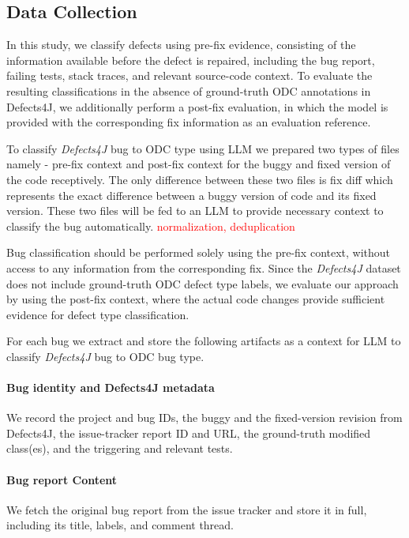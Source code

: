 \subsection{Data Collection}
\label{subsec:collection}
In this study, we classify defects using pre-fix evidence, consisting of the information available before the defect is repaired, including the bug report, failing tests, stack traces, and relevant source-code context. To evaluate the resulting classifications in the absence of ground-truth ODC annotations in Defects4J, we additionally perform a post-fix evaluation, in which the model is provided with the corresponding fix information as an evaluation reference.

To classify \textit{Defects4J} bug to ODC type using LLM we prepared two types of files namely - pre-fix context and post-fix context for the buggy and fixed version of the code receptively. The only difference between these two files is fix diff which represents the exact difference between a buggy version of code and its fixed version. These two files will be fed to an LLM to provide necessary context to classify the bug automatically. \textcolor{red}{normalization, deduplication}


Bug classification should be performed solely using the pre-fix context, without access to any information from the corresponding fix. Since the \textit{Defects4J} dataset does not include ground-truth ODC defect type labels, we evaluate our approach by using the post-fix context, where the actual code changes provide sufficient evidence for defect type classification.

For each bug we extract and store the following artifacts as a context for LLM to classify \textit{Defects4J} bug to ODC bug type.  

\paragraph{Bug identity and Defects4J metadata}
We record the project and bug IDs, the buggy and the
fixed-version revision from Defects4J, the issue-tracker report ID and URL,
the ground-truth modified class(es), and the triggering and relevant tests.

\paragraph{Bug report Content}
We fetch the original bug report from the issue tracker and store it in
full, including its title, labels, and comment thread.

